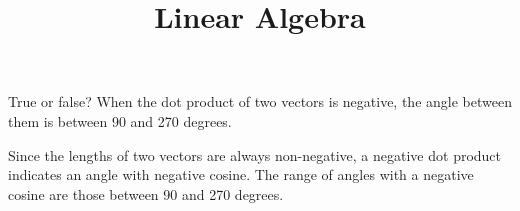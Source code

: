 \documentclass{ximera}
\title{Linear Algebra}
\begin{document}
\maketitle

\begin{question}
True or false?  When the dot product of two vectors is negative, the angle between them is between 90 and 270 degrees.
\begin{solution}
\begin{multiple-choice}
\end{multiple-choice}
\end{solution}
Since the lengths of two vectors are always non-negative, a negative dot product indicates an angle with negative cosine. The range of angles with a negative cosine are those between 90 and 270 degrees.
\end{question}
\end{document}
